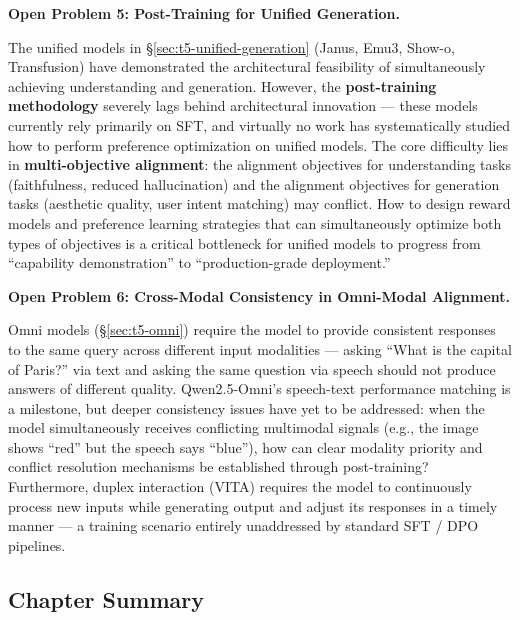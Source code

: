 \begin{openproblembox}
\textbf{Open Problem 5: Post-Training for Unified Generation.}

The unified models in \S\ref{sec:t5-unified-generation} (Janus, Emu3, Show-o, Transfusion)
have demonstrated the architectural feasibility of simultaneously achieving understanding and generation.
However, the \textbf{post-training methodology} severely lags behind architectural innovation ---
these models currently rely primarily on SFT,
and virtually no work has systematically studied how to perform preference optimization on unified models.
The core difficulty lies in \textbf{multi-objective alignment}:
the alignment objectives for understanding tasks (faithfulness, reduced hallucination)
and the alignment objectives for generation tasks (aesthetic quality, user intent matching)
may conflict.
How to design reward models and preference learning strategies
that can simultaneously optimize both types of objectives
is a critical bottleneck for unified models to progress from ``capability demonstration'' to ``production-grade deployment.''
\end{openproblembox}

\begin{openproblembox}
\textbf{Open Problem 6: Cross-Modal Consistency in Omni-Modal Alignment.}

Omni models (\S\ref{sec:t5-omni}) require the model to provide consistent responses
to the same query across different input modalities ---
asking ``What is the capital of Paris?'' via text and asking the same question via speech
should not produce answers of different quality.
Qwen2.5-Omni's speech-text performance matching is a milestone,
but deeper consistency issues have yet to be addressed:
when the model simultaneously receives conflicting multimodal signals
(e.g., the image shows ``red'' but the speech says ``blue''),
how can clear modality priority and conflict resolution mechanisms be established through post-training?
Furthermore, duplex interaction (VITA) requires the model to
continuously process new inputs while generating output and adjust its responses in a timely manner ---
a training scenario entirely unaddressed by standard SFT / DPO pipelines.
\end{openproblembox}

\subsection{Chapter Summary}

